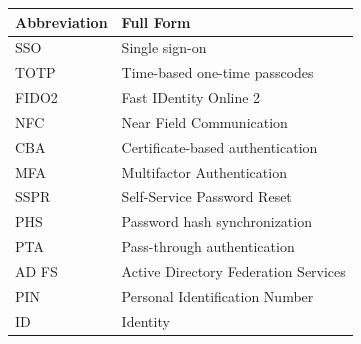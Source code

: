 \documentclass[10pt]{article}
\begin{document}
\begin{center}
\begin{tabular}{>{\raggedright\arraybackslash}p{} >{\raggedright\arraybackslash}p{}}
\toprule
\textbf{Abbreviation} & \textbf{Full Form} \\
\midrule
SSO & Single sign-on \\
TOTP & Time-based one-time passcodes \\
FIDO2 & Fast IDentity Online 2 \\
NFC & Near Field Communication \\
CBA & Certificate-based authentication \\
MFA & Multifactor Authentication \\
SSPR & Self-Service Password Reset \\
PHS & Password hash synchronization \\
PTA & Pass-through authentication \\
AD FS & Active Directory Federation Services \\
PIN & Personal Identification Number \\
ID & Identity \\
\bottomrule
\end{tabular}
\end{center}
\end{document}
